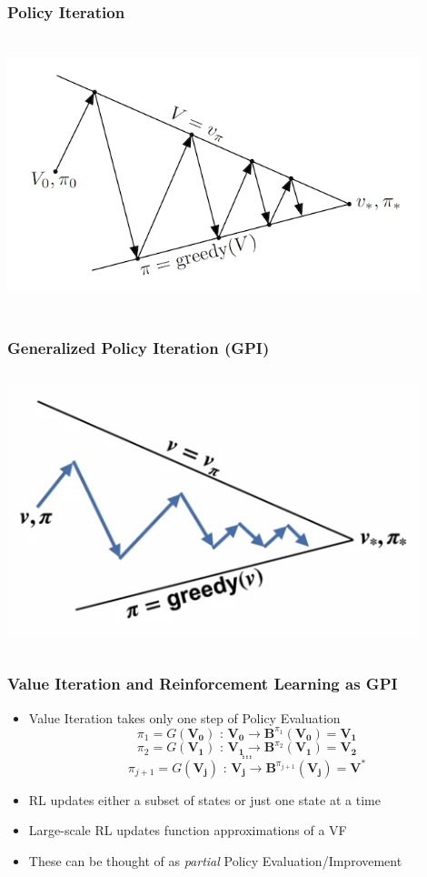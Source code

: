 \documentclass[handout]{beamer}
\newcommand{\bvs}{\bm{V}^*}
\begin{document}
\begin{frame}
\frametitle{Policy Iteration}
\includegraphics[width=12cm, height=8cm]{vf_policy_intersecting_lines.png}
\end{frame}

\begin{frame}
\frametitle{Generalized Policy Iteration (GPI)}
\includegraphics[width=12cm, height=8cm]{gpi.png}
\end{frame}

\begin{frame}
\frametitle{Value Iteration and Reinforcement Learning as GPI}
\pause
\begin{itemize}[<+->]
\item Value Iteration takes only one step of Policy Evaluation
$$\pi_1 = G(\bm{V_0}) \text{ : } \bm{V_0} \rightarrow \bm{B}^{\pi_1}(\bm{V_0}) = \bm{V_1}$$
$$\pi_2 = G(\bm{V_1}) \text{ : } \bm{V_1} \rightarrow \bm{B}^{\pi_2}(\bm{V_1}) = \bm{V_2}$$
$$\ldots$$
$$\ldots$$
$$\pi_{j+1} = G(\bm{V_j}) \text{ : } \bm{V_j} \rightarrow \bm{B}^{\pi_{j+1}}(\bm{V_j}) = \bvs$$
\item RL updates either a subset of states or just one state at a time
\item Large-scale RL updates function approximations of a VF
\item These can be thought of as {\em partial} Policy Evaluation/Improvement
\end{itemize}
\end{frame}
\end{document}

